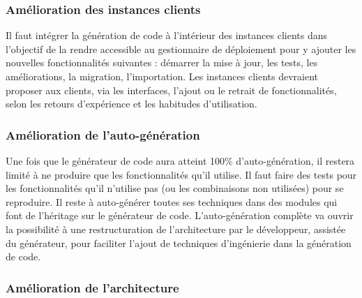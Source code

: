 \subsubsection{Amélioration des instances clients}

Il faut intégrer la génération de code à l’intérieur des instances clients dans l’objectif de la rendre accessible au gestionnaire de déploiement pour y ajouter les nouvelles fonctionnalités suivantes : démarrer la mise à jour, les tests, les améliorations, la migration, l'importation. Les instances clients devraient proposer aux clients, via les interfaces, l'ajout ou le retrait de fonctionnalités, selon les retours d'expérience et les habitudes d'utilisation.




\subsubsection{Amélioration de l'auto-génération}

Une fois que le générateur de code aura atteint 100\% d’auto-génération, il restera limité à ne produire que les fonctionnalités qu’il utilise. Il faut faire des tests pour les fonctionnalités qu’il n’utilise pas (ou les combinaisons non utilisées) pour se reproduire. Il reste à auto-générer toutes ses techniques dans des modules qui font de l'héritage sur le générateur de code. L'auto-génération complète va ouvrir la possibilité à une restructuration de l'architecture par le développeur, assistée du générateur, pour faciliter l'ajout de techniques d'ingénierie dans la génération de code.


\subsubsection{Amélioration de l’architecture}

